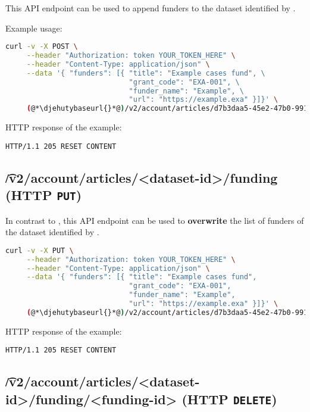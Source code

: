   This API endpoint can be used to append funders to the dataset identified
  by .

  Example usage:
\begin{lstlisting}[language=bash]
curl -v -X POST \
     --header "Authorization: token YOUR_TOKEN_HERE" \
     --header "Content-Type: application/json" \
     --data '{ "funders": [{ "title": "Example cases fund", \
                             "grant_code": "EXA-001", \
                             "funder_name": "Example", \
                             "url": "https://example.exa" }]}' \
     (@*\djehutybaseurl{}*@)/v2/account/articles/d7b3daa5-45e2-47b0-9910-0f7fa6a995b1/funding
\end{lstlisting}

  HTTP response of the example:
\begin{lstlisting}
HTTP/1.1 205 RESET CONTENT
\end{lstlisting}

\subsection{\t{/v2/account/articles/<dataset-id>/funding} (HTTP \texttt{PUT})}

  In contrast to , this API endpoint
  can be used to \textbf{overwrite} the list of funders of the dataset
  identified by .

\begin{lstlisting}[language=bash]
curl -v -X PUT \
     --header "Authorization: token YOUR_TOKEN_HERE" \
     --header "Content-Type: application/json" \
     --data '{ "funders": [{ "title": "Example cases fund",
                             "grant_code": "EXA-001",
                             "funder_name": "Example",
                             "url": "https://example.exa" }]}' \
     (@*\djehutybaseurl{}*@)/v2/account/articles/d7b3daa5-45e2-47b0-9910-0f7fa6a995b1/funding
\end{lstlisting}

  HTTP response of the example:
\begin{lstlisting}
HTTP/1.1 205 RESET CONTENT
\end{lstlisting}

\subsection{\t{/v2/account/articles/<dataset-id>/funding/<funding-id>} (HTTP \texttt{DELETE})}

